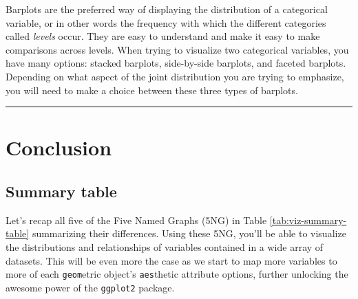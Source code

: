 \documentclass[12pt, krantz2,]{krantz}
\begin{document}
Barplots are the preferred way of displaying the distribution of a categorical variable, or in other words the frequency with which the different categories called \emph{levels} occur. They are easy to understand and make it easy to make comparisons across levels. When trying to visualize two categorical variables, you have many options: stacked barplots, side-by-side barplots, and faceted barplots. Depending on what aspect of the joint distribution you are trying to emphasize, you will need to make a choice between these three types of barplots.

\begin{center}\rule{0.5\linewidth}{\linethickness}\end{center}

\hypertarget{conclusion-1}{%
\section{Conclusion}\label{conclusion-1}}

\hypertarget{summary-table}{%
\subsection{Summary table}\label{summary-table}}

Let's recap all five of the Five Named Graphs (5NG) in Table \ref{tab:viz-summary-table} summarizing their differences. Using these 5NG, you'll be able to visualize the distributions and relationships of variables contained in a wide array of datasets. This will be even more the case as we start to map more variables to more of each \texttt{geom}etric object's \texttt{aes}thetic attribute options, further unlocking the awesome power of the \texttt{ggplot2} package.
\end{document}
